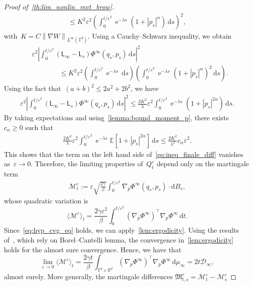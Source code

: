 \documentclass[onefignum,onetabnum]{siamart251216} %
\DeclareMathOperator{\e}{e}
\renewcommand{\d}{\mathrm{d}}
\newcommand{\expect}{\mathbb E}
\newcommand{\norm}[1]{\left\lVert#1\right\rVert}
\newcommand{\torus}{\mathbb T}
\newcommand{\real}{\mathbb R}
\newcommand{\mc}[1]{\mathcal{#1}}
\renewcommand{\leq}{\leqslant}
\renewcommand{\geq}{\geqslant}
\newcommand{\mescin}{\mu}
\newcommand{\normT}[1]{\norm{#1}_{L^\infty(\torus^d)}}
\newcommand{\gennonlin}[1]{\mathsf{L}_{#1}}
\newcommand{\genlin}{\mathsf{L}_\infty}
\newcommand{\eps}{\varepsilon}
\newcommand{\SolPois}{\Phi^\infty}
\theoremstyle{plain}
\numberwithin{equation}{section}
\numberwithin{theorem}{section}
\begin{document}
\begin{proof}[Proof of~\cref{th:lim_nonlin_mvt_brow}]
\begin{align}
    \leq  K^2\eps^2\!\left(\int_0^{t/\eps^2} \e^{-\lambda s} (1+|p_s|^\alpha)\,\d s\right)^2,
\end{align}
with~$K = C\normT{\nabla W}$. Using a Cauchy--Schwarz inequality, we obtain
\begin{align*}
    &\eps^2\!\left|\int_0^{t/\eps^2} (\genlin- \gennonlin{s}) \SolPois(q_s,p_s)\, \d s\right|^2 \\
    &\qquad\qquad\leq K^2\eps^2 \!\left(\int_0^{t/\eps^2} \e^{-\lambda s}\, \d s\!\right)
    \!\left(\int_0^{t/\eps^2} \e^{-\lambda s} (1+|p_s|^\alpha)^2\,\d s\right)\!.
\end{align*}
Using the fact that~$(a+b)^2 \leq 2a^2 + 2b^2$, we have
\begin{align}
    \label{preque_fini}
    \eps^2\left|\int_0^{t/\eps^2} (\genlin- \gennonlin{s}) \SolPois(q_s,p_s)\, \d s\right|^2
    \leq  \frac{2 K^2}{\lambda} \eps^2\int_0^{t/\eps^2}\e^{-\lambda s} (1+|p_s|^{2\alpha})\,\d s.
\end{align}
By taking expectations and using~\cref{lemma:bound_moment_p}, there exists~$c_\alpha \geq 0$ such that
\begin{align}
    \label{fini}
     \frac{2 K^2}{\lambda} \eps^2\int_0^{t/\eps^2} \e^{-\lambda s} \expect\left[1+|p_s|^{2\alpha}\right]\,\d s \leq \frac{2K^2}{\lambda^2}  c_\alpha \eps^2.
\end{align}
This shows that the term on the left hand side of~\eqref{eq:ineq_finale_diff} vanishes as~$\eps \to 0$. Therefore, the limiting properties of~$Q_t^\eps$ depend only on the martingale term
\begin{align*}
 \mc{M}^{\eps}_t :=  \eps\sqrt{\frac{2\gamma}{\beta}}\int_0^{t/\eps^2} \nabla_p\SolPois(q_s,p_s)\cdot\d B_s,
\end{align*}
whose quadratic variation is
    \[
    \langle \mc{M}^{\eps} \rangle_t = \frac{2\gamma \eps^2}{\beta} \int_0^{t/\eps^2} (\nabla_p \SolPois)^\top \nabla_p \SolPois \, \d t.
    \]
    Since~\eqref{eq:hyp_cvg_eq} holds, we can apply~\cref{lem:ergodicity}. Using the results of~\cite[Section 4.2]{mattingly2010convergence}, which rely on Borel--Cantelli lemma, the convergence in~\cref{lem:ergodicity} holds for the almost sure convergence. Hence, we have that
    \[
    \lim_{\eps \to 0} \langle \mc{M}^{\eps} \rangle_t = \frac{2\gamma t}{\beta} \int_{\torus^d \times \real^d}( \nabla_p \SolPois)^\top \nabla_p \SolPois \, \d \mescin_{\infty}
    = 2t \mc{D}_\infty,
    \]
    almost surely.
    More generally, the martingale differences $\mathfrak{M}^{\eps}_{t,s} = \mc{M}^{\eps}_t - \mc{M}^{\eps}_{s}$

\end{proof}
\end{document}
